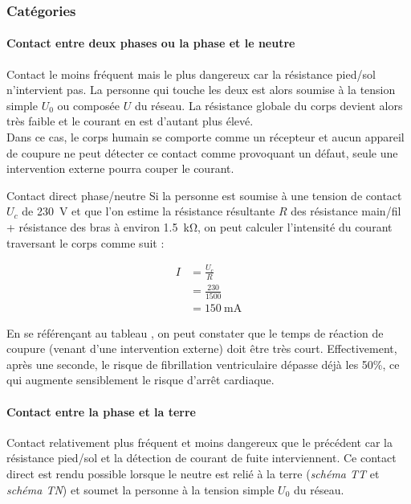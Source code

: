 \documentclass[a4paper, 11pt, twoside, fleqn]{memoir}
\begin{document}
\subsubsection{Catégories}



\paragraph{Contact entre deux phases ou la phase et le neutre} 
Contact le moins fréquent mais le plus dangereux car la résistance pied/sol n'intervient pas. La personne qui touche les deux est alors soumise à la tension simple \(U_0\) ou composée \(U\) du réseau. La résistance globale du corps devient alors très faible et le courant en est d'autant plus élevé.\\ Dans ce cas, le corps humain se comporte comme un récepteur et aucun appareil de coupure ne peut détecter ce contact comme provoquant un défaut, seule une intervention externe pourra couper le courant.\\

\begin{exemple}{Contact direct phase/neutre}{}
Si la personne est soumise à une tension de contact \(U_c\) de \SI{230}{\volt} et que l'on estime la résistance résultante \(R\) des résistance main/fil + résistance des bras à environ \SI{1,5}{\kilo\ohm}, on peut calculer l'intensité du courant traversant le corps comme suit :

\begin{align*}
I 	&= \frac{U_c}{R} \\
	&= \frac{230}{1500} \\
	&= \SI{150}{\milli\ampere}
\end{align*}

En se référençant au tableau , on peut constater que le temps de réaction de coupure (venant d'une intervention externe) doit être très court. Effectivement, après une seconde, le risque de fibrillation ventriculaire dépasse déjà les 50\%, ce qui augmente sensiblement le risque d'arrêt cardiaque.
\end{exemple}



\paragraph{Contact entre la phase et la terre}
Contact relativement plus fréquent et moins dangereux que le précédent car la résistance pied/sol et la détection de courant de fuite interviennent. Ce contact direct est rendu possible lorsque le neutre est relié à la terre (\emph{schéma TT} et \emph{schéma TN}) et soumet la personne à la tension simple \(U_0\) du réseau.\\
\end{document}
